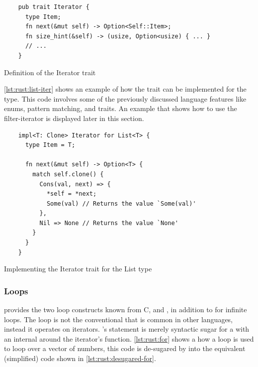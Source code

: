 \begin{listing}[H]
  \begin{verbatim}
    pub trait Iterator {
      type Item;
      fn next(&mut self) -> Option<Self::Item>;
      fn size_hint(&self) -> (usize, Option<usize) { ... }
      // ...
    }
  \end{verbatim}
  \caption{Definition of the Iterator trait}
  \label{lst:rust:iterator}
\end{listing}

\autoref{lst:rust:list-iter}  shows an example of how the  trait can be implemented for the  type.
This code involves some of the previously discussed language features like enums, pattern matching, and traits.
An example that shows how to use the filter-iterator is displayed later in this section.

\begin{listing}[H]
  \begin{verbatim}
    impl<T: Clone> Iterator for List<T> {
      type Item = T;

      fn next(&mut self) -> Option<T> {
        match self.clone() {
          Cons(val, next) => {
            *self = *next;
            Some(val) // Returns the value `Some(val)'
          },
          Nil => None // Returns the value `None'
        }
      }
    }
  \end{verbatim}
  \caption{Implementing the Iterator trait for the List type}
  \label{lst:rust:list-iter}
\end{listing}


\subsubsection{Loops}

{\rust} provides the two loop constructs known from C,  and , in addition to  for infinite loops.
The  loop is not the conventional  that is common in other languages, instead it operates on iterators.
\rust's  statement is merely syntactic sugar for a  with an internal  around the iterator's  function.
\autoref{lst:rust:for} shows a how a  loop is used to loop over a vector of numbers, this code is de-sugared by {\rust} into the equivalent (simplified) code shown in \autoref{lst:rust:desugared-for}.

